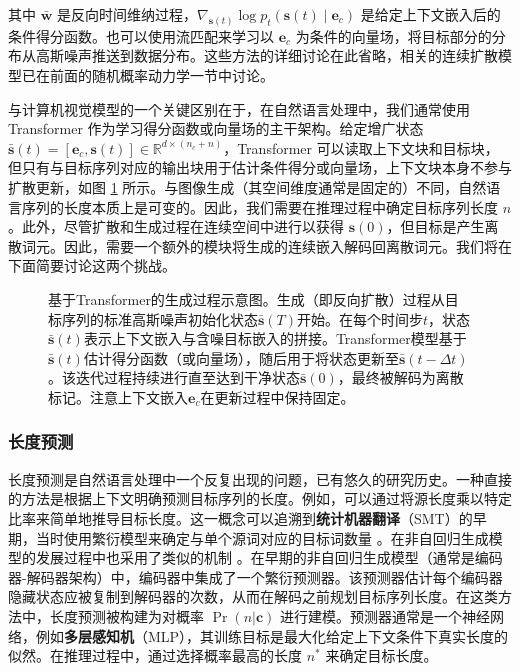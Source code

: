 \documentclass[UTF8,a4paper,zihao=-4,oneside,openany]{ctexbook}
\makeatletter
\newcommand{\AMLFigure}[2][0.96\linewidth]{%
  \begingroup
  \let\AtBeginDocument\@gobble
  \endgroup
}
\makeatother
\begin{document}
\noindent 其中 $\bar{\mathbf{w}}$ 是反向时间维纳过程，$\nabla_{\mathbf{s}(t)}\log p_t(\mathbf{s}(t)\mid\mathbf{e}_c)$ 是给定上下文嵌入后的条件得分函数。也可以使用流匹配来学习以 $\mathbf{e}_c$ 为条件的向量场，将目标部分的分布从高斯噪声推送到数据分布。这些方法的详细讨论在此省略，相关的连续扩散模型已在前面的随机概率动力学一节中讨论。

与计算机视觉模型的一个关键区别在于，在自然语言处理中，我们通常使用 Transformer 作为学习得分函数或向量场的主干架构。给定增广状态 $\bar{\mathbf{s}}(t) = [\mathbf{e}_c, \mathbf{s}(t)] \in \mathbb{R}^{d \times (n_c + n)}$，Transformer 可以读取上下文块和目标块，但只有与目标序列对应的输出块用于估计条件得分或向量场，上下文块本身不参与扩散更新，如图 \ref{fig:transformer-based-generation-process} 所示。与图像生成（其空间维度通常是固定的）不同，自然语言序列的长度本质上是可变的。因此，我们需要在推理过程中确定目标序列长度 $n$。此外，尽管扩散和生成过程在连续空间中进行以获得 $\mathbf{s}(0)$，但目标是产生离散词元。因此，需要一个额外的模块将生成的连续嵌入解码回离散词元。我们将在下面简要讨论这两个挑战。

\begin{figure}[!t]
\centering
\AMLFigure{figure-transformer-based-generation-process}
\caption{基于Transformer的生成过程示意图。生成（即反向扩散）过程从目标序列的标准高斯噪声初始化状态$\bar{\mathbf{s}}(T)$开始。在每个时间步$t$，状态$\bar{\mathbf{s}}(t)$表示上下文嵌入与含噪目标嵌入的拼接。Transformer模型基于$\bar{\mathbf{s}}(t)$估计得分函数（或向量场），随后用于将状态更新至$\bar{\mathbf{s}}(t-\Delta t)$。该迭代过程持续进行直至达到干净状态$\bar{\mathbf{s}}(0)$，最终被解码为离散标记。注意上下文嵌入$\mathbf{e}_c$在更新过程中保持固定。}
\label{fig:transformer-based-generation-process}
\end{figure}
\subsubsection{长度预测}

长度预测是自然语言处理中一个反复出现的问题，已有悠久的研究历史。一种直接的方法是根据上下文明确预测目标序列的长度。例如，可以通过将源长度乘以特定比率来简单地推导目标长度。这一概念可以追溯到\textbf{统计机器翻译}（SMT）的早期，当时使用繁衍模型来确定与单个源词对应的目标词数量 \citep{brown-etal:1993mathematics}。在非自回归生成模型的发展过程中也采用了类似的机制 \citep{xiao-etal:2023survey}。在早期的非自回归生成模型（通常是编码器-解码器架构）中，编码器中集成了一个繁衍预测器。该预测器估计每个编码器隐藏状态应被复制到解码器的次数，从而在解码之前规划目标序列长度。在这类方法中，长度预测被构建为对概率 $\Pr(n|\mathbf{c})$ 进行建模。预测器通常是一个神经网络，例如\textbf{多层感知机}（MLP），其训练目标是最大化给定上下文条件下真实长度的似然。在推理过程中，通过选择概率最高的长度 $n^*$ 来确定目标长度。
\end{document}
